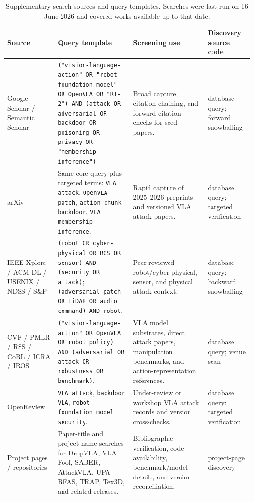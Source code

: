 \begin{table}[t]
\centering
\scriptsize
\caption{Supplementary search sources and query templates. Searches were last run on 16 June 2026 and covered works available up to that date.}
\label{tab:search-protocol}
\renewcommand{\arraystretch}{1.08}
\setlength{\tabcolsep}{2pt}
\begin{tabularx}{\textwidth}{@{}p{}p{}Y p{0.16\textwidth}@{}}
\toprule
\textbf{Source} & \textbf{Query template} & \textbf{Screening use} & \textbf{Discovery source code} \\
\midrule
Google Scholar / Semantic Scholar & \texttt{("vision-language-action" OR "robot foundation model" OR OpenVLA OR "RT-2") AND (attack OR adversarial OR backdoor OR poisoning OR privacy OR "membership inference")} & Broad capture, citation chaining, and forward-citation checks for seed papers. & database query; forward snowballing \\
arXiv & Same core query plus targeted terms: \texttt{VLA attack}, \texttt{OpenVLA patch}, \texttt{action chunk backdoor}, \texttt{VLA membership inference}. & Rapid capture of 2025--2026 preprints and versioned VLA attack papers. & database query; targeted verification \\
IEEE Xplore / ACM DL / USENIX / NDSS / S\&P & \texttt{(robot OR cyber-physical OR ROS OR sensor) AND (security OR attack)}; \texttt{(adversarial patch OR LiDAR OR audio command) AND robot}. & Peer-reviewed robot/cyber-physical, sensor, and physical attack context. & database query; backward snowballing \\
CVF / PMLR / RSS / CoRL / ICRA / IROS & \texttt{("vision-language-action" OR OpenVLA OR robot policy) AND (adversarial OR attack OR robustness OR benchmark)}. & VLA model substrates, direct attack papers, manipulation benchmarks, and action-representation references. & database query; venue scan \\
OpenReview & \texttt{VLA attack}, \texttt{backdoor VLA}, \texttt{robot foundation model security}. & Under-review or workshop VLA attack records and version cross-checks. & database query; targeted verification \\
Project pages / repositories & Paper-title and project-name searches for DropVLA, VLA-Fool, SABER, AttackVLA, UPA-RFAS, TRAP, Tex3D, and related releases. & Bibliographic verification, code availability, benchmark/model details, and version reconciliation. & project-page discovery \\
\bottomrule
\end{tabularx}
\end{table}
